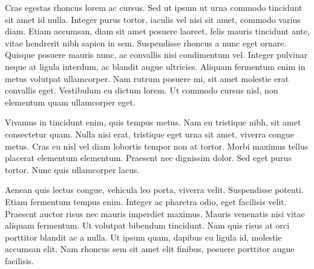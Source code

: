 Cras egestas rhoncus lorem ac cursus. Sed ut ipsum ut urna commodo tincidunt sit amet id nulla. Integer purus tortor, iaculis vel nisi sit amet, commodo varius diam. Etiam accumsan, diam sit amet posuere laoreet, felis mauris tincidunt ante, vitae hendrerit nibh sapien in sem. Suspendisse rhoncus a nunc eget ornare. Quisque posuere mauris nunc, ac convallis nisi condimentum vel. Integer pulvinar neque at ligula interdum, ac blandit augue ultricies. Aliquam fermentum enim in metus volutpat ullamcorper. Nam rutrum posuere mi, sit amet molestie erat convallis eget. Vestibulum eu dictum lorem. Ut commodo cursus nisl, non elementum quam ullamcorper eget.

Vivamus in tincidunt enim, quis tempus metus. Nam eu tristique nibh, sit amet consectetur quam. Nulla nisi erat, tristique eget urna sit amet, viverra congue metus. Cras eu nisl vel diam lobortis tempor non at tortor. Morbi maximus tellus placerat elementum elementum. Praesent nec dignissim dolor. Sed eget purus tortor. Nunc quis ullamcorper lacus.

Aenean quis lectus congue, vehicula leo porta, viverra velit. Suspendisse potenti. Etiam fermentum tempus enim. Integer ac pharetra odio, eget facilisis velit. Praesent auctor risus nec mauris imperdiet maximus. Mauris venenatis nisi vitae aliquam fermentum. Ut volutpat bibendum tincidunt. Nam quis risus at orci porttitor blandit ac a nulla. Ut ipsum quam, dapibus eu ligula id, molestie accumsan elit. Nam rhoncus sem sit amet elit finibus, posuere porttitor augue facilisis.

